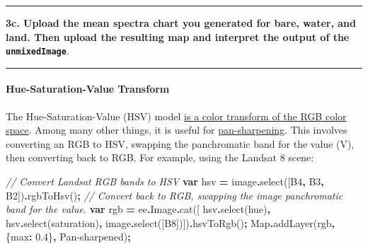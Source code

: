\documentclass[
]{article}
\newenvironment{Shaded}{\begin{snugshade}}{\end{snugshade}}
\newcommand{\AttributeTok}[1]{\textcolor[rgb]{0.77,0.63,0.00}{#1}}
\newcommand{\BuiltInTok}[1]{#1}
\newcommand{\CommentTok}[1]{\textcolor[rgb]{0.56,0.35,0.01}{\textit{#1}}}
\newcommand{\DataTypeTok}[1]{\textcolor[rgb]{0.13,0.29,0.53}{#1}}
\newcommand{\FloatTok}[1]{\textcolor[rgb]{0.00,0.00,0.81}{#1}}
\newcommand{\FunctionTok}[1]{\textcolor[rgb]{0.00,0.00,0.00}{#1}}
\newcommand{\KeywordTok}[1]{\textcolor[rgb]{0.13,0.29,0.53}{\textbf{#1}}}
\newcommand{\NormalTok}[1]{#1}
\newcommand{\OperatorTok}[1]{\textcolor[rgb]{0.81,0.36,0.00}{\textbf{#1}}}
\newcommand{\StringTok}[1]{\textcolor[rgb]{0.31,0.60,0.02}{#1}}
\begin{document}
\begin{center}\rule{0.5\linewidth}{0.5pt}\end{center}

\textbf{3c. Upload the mean spectra chart you generated for bare, water, and land. Then upload the resulting map and interpret the output of the \texttt{unmixedImage}}.

\begin{center}\rule{0.5\linewidth}{0.5pt}\end{center}

\hypertarget{hue-saturation-value-transform}{%
\paragraph{Hue-Saturation-Value Transform}\label{hue-saturation-value-transform}}

The Hue-Saturation-Value (HSV) model \href{https://en.wikipedia.org/wiki/HSL_and_HSV}{is a color transform of the RGB color space}. Among many other things, it is useful for \href{https://en.wikipedia.org/wiki/Pansharpened_image}{pan-sharpening}. This involves converting an RGB to HSV, swapping the panchromatic band for the value (V), then converting back to RGB. For example, using the Landsat 8 scene:

\begin{Shaded}
\begin{Highlighting}[]
\CommentTok{//  Convert Landsat RGB bands to HSV   }
\KeywordTok{var}\NormalTok{ hsv }\OperatorTok{=}\NormalTok{ image}\OperatorTok{.}\FunctionTok{select}\NormalTok{([}\StringTok{\textquotesingle{}B4\textquotesingle{}}\OperatorTok{,} \StringTok{\textquotesingle{}B3\textquotesingle{}}\OperatorTok{,} \StringTok{\textquotesingle{}B2\textquotesingle{}}\NormalTok{])}\OperatorTok{.}\FunctionTok{rgbToHsv}\NormalTok{()}\OperatorTok{;}
\CommentTok{// Convert back to RGB,  swapping the image panchromatic band for the value.}
\KeywordTok{var}\NormalTok{ rgb }\OperatorTok{=}\NormalTok{ ee}\OperatorTok{.}\AttributeTok{Image}\OperatorTok{.}\FunctionTok{cat}\NormalTok{([}
\NormalTok{  hsv}\OperatorTok{.}\FunctionTok{select}\NormalTok{(}\StringTok{\textquotesingle{}hue\textquotesingle{}}\NormalTok{)}\OperatorTok{,}
\NormalTok{  hsv}\OperatorTok{.}\FunctionTok{select}\NormalTok{(}\StringTok{\textquotesingle{}saturation\textquotesingle{}}\NormalTok{)}\OperatorTok{,}
\NormalTok{  image}\OperatorTok{.}\FunctionTok{select}\NormalTok{([}\StringTok{\textquotesingle{}B8\textquotesingle{}}\NormalTok{])])}\OperatorTok{.}\FunctionTok{hsvToRgb}\NormalTok{()}\OperatorTok{;}
\BuiltInTok{Map}\OperatorTok{.}\FunctionTok{addLayer}\NormalTok{(rgb}\OperatorTok{,}\NormalTok{ \{}\DataTypeTok{max}\OperatorTok{:} \FloatTok{0.4}\NormalTok{\}}\OperatorTok{,} \StringTok{\textquotesingle{}Pan{-}sharpened\textquotesingle{}}\NormalTok{)}\OperatorTok{;}  
\end{Highlighting}
\end{Shaded}
\end{document}
